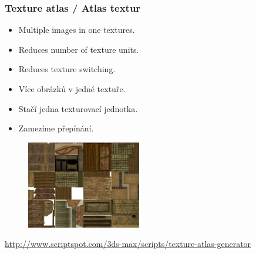 \begin{frame}[fragile]\frametitle{Texture atlas / Atlas textur}
	\begin{itemize}
	\item Multiple images in one textures.
	\item Reduces number of texture units.
	\item Reduces texture switching.
	\end{itemize}

	\begin{itemize}
	\item Více obrázků v jedné textuře.
	\item Stačí jedna texturovací jednotka.
	\item Zamezíme přepínání.
	\end{itemize}
	\begin{figure}[h]
		\includegraphics[width=5cm,keepaspectratio]{pics/texture/textureatlas.jpg}
	\end{figure}
	\url{http://www.scriptspot.com/3ds-max/scripts/texture-atlas-generator}
\end{frame}

